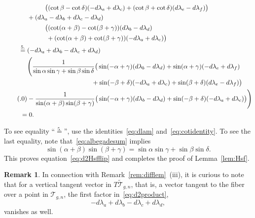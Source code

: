 \documentclass[a4paper, 11pt]{article}
\newcommand{\Teich}{\mathcal{T}}
\newcommand{\decTeich}{\widetilde{\Teich}}
\theoremstyle{plain}
\theoremstyle{definition}
\newtheorem{remark}[theorem]{Remark}
\begin{document}
\begin{align*}
  & \hphantom{+}\qquad
    \big(
    (\cot\beta-\cot\delta)(-d\lambda_{a}+d\lambda_{c})
    +
    (\cot\beta+\cot\delta)(d\lambda_{e}-d\lambda_{f})
    \big)\\
  & +
    (d\lambda_{a}-d\lambda_{b}+d\lambda_{c}-d\lambda_{d})\\
  & \hphantom{+}\qquad
    \big(
    (\cot(\alpha+\beta)-\cot(\beta+\gamma))(d\lambda_{b}-d\lambda_{d})\\
  & \qquad\quad +
    (\cot(\alpha+\beta)+\cot(\beta+\gamma))(-d\lambda_{a}+d\lambda_{c})
    \big)\\
  \overset{5.}{=}\;
  & (-d\lambda_{a}+d\lambda_{b}-d\lambda_{c}+d\lambda_{d})\\
  & \Bigg(
    \frac{1}{\sin\alpha\sin\gamma+\sin\beta\sin\delta}
    \big(
    \sin(-\alpha+\gamma)(d\lambda_{b}-d\lambda_{d})
    + \sin(\alpha+\gamma)(-d\lambda_{e}+d\lambda_{f})\\
  & \qquad\qquad\qquad\qquad\qquad
    + \sin(-\beta+\delta)(-d\lambda_{a}+d\lambda_{c})
    + \sin(\beta+\delta)(d\lambda_{e}-d\lambda_{f})\big)\\
  \stepcounter{equation}\tag{\theequation}\label{eq:d2product}
  & 
    -\frac{1}{\sin(\alpha+\beta)\sin(\beta+\gamma)}
    \big(
    \sin(-\alpha+\gamma)(d\lambda_{b}-d\lambda_{d})
    + \sin(-\beta+\delta)(-d\lambda_{a}+d\lambda_{c})
    \big)
    \Bigg)\\
  = & \;0.
\end{align*}
\endgroup

To see equality ``$\overset{5.}{=}$'', use the
identities~\eqref{eq:dlam} and~\eqref{eq:cotidentity}.
To see the last equality, note that~\eqref{eq:albegadesum} implies
\begin{equation}
  \label{eq:sinsum}
  \sin(\alpha+\beta)\sin(\beta+\gamma)
  = \sin\alpha\sin\gamma+\sin\beta\sin\delta.
\end{equation}
This proves equation~\eqref{eq:d2Hsfflip} and completes the proof of
Lemma~\ref{lem:Hsf}.


\begin{remark}
  In connection with Remark~\ref{rem:difflem}~(iii), it is curious to note
  that for a vertical tangent vector in $T\decTeich_{g,n}$, that is, a
  vector tangent to the fiber over a point in $\Teich_{g,n}$, the first factor in~\eqref{eq:d2product},
  \begin{equation*}
    -d\lambda_{a}+d\lambda_{b}-d\lambda_{c}+d\lambda_{d},
  \end{equation*}
  vanishes as well.
\end{remark}
\end{document}
